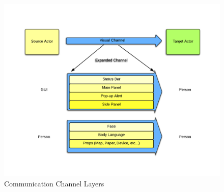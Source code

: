 \begin{figure}[h]
\begin{center}
\includegraphics[width=5in]{layers.png}
\caption{Communication Channel Layers}
\label{fig:layers}
\end{center}
\end{figure}
